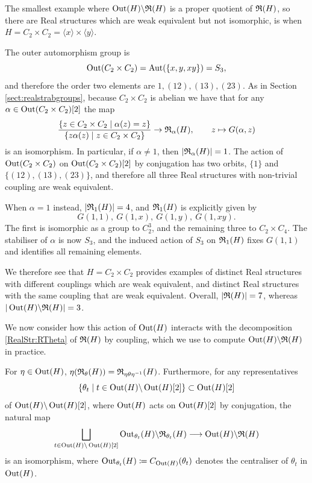\begin{eg}
The smallest example where $\operatorname{Out}(H) \backslash {\mathfrak R}(H)$ is a proper quotient of ${\mathfrak R}(H)$, so there are Real structures which are weak equivalent but not isomorphic, is when $H = C_2 \times C_2 = \langle x \rangle \times \langle y \rangle$. 

The outer automorphism group is
\[
\operatorname{Out}(C_2 \times C_2) = \operatorname{Aut}(\{x,y,xy\}) = S_3,
\]
and therefore the order two elements are $1, (12), (13), (23)$. As in Section \ref{sect:realstrabgroups}, because $C_2 \times C_2$ is abelian we have that for any $\alpha \in \operatorname{Out}(C_2 \times C_2)[2]$ the map 
\[
\frac{\{z \in C_2 \times C_2 \mid \alpha(z) = z\}}{\{z\alpha(z) \mid z \in C_2 \times C_2\}} \rightarrow {\mathfrak R}_{\alpha}(H), \qquad z \mapsto G(\alpha, z)
\]
is an isomorphism. In particular, if $\alpha \neq 1$, then $|{\mathfrak R}_{\alpha}(H)| = 1$. The action of $\operatorname{Out}(C_2 \times C_2)$ on $\operatorname{Out}(C_2 \times C_2)[2]$ by conjugation has two orbits, $\{1\}$ and $\{(12), (13), (23)\}$, and therefore all three Real structures with non-trivial coupling are weak equivalent.

When $\alpha = 1$ instead, $|{\mathfrak R}_{1}(H)| = 4$, and ${\mathfrak R}_{1}(H)$ is explicitly given by 
\[
G(1, 1), \: G(1,x), \: G(1,y), \: G(1,xy).
\]
The first is isomorphic as a group to $C_2^3$, and the remaining three to $C_2 \times C_4$. The stabiliser of $\alpha$ is now $S_3$, and the induced action of $S_3$ on ${\mathfrak R}_{1}(H)$ fixes $G(1,1)$ and identifies all remaining elements.

We therefore see that $H = C_2 \times C_2$ provides examples of distinct Real structures with different couplings which are weak equivalent, and distinct Real structures with the same coupling that are weak equivalent. Overall, $|{\mathfrak R}(H)| = 7$, whereas $|\operatorname{Out}(H) \backslash {\mathfrak R}(H)| = 3$. 
\end{eg}

We now consider how this action of $\operatorname{Out}(H)$ interacts with the decomposition \eqref{RealStr:RTheta} of ${\mathfrak R}(H)$ by coupling, which we use to compute $\operatorname{Out}(H) \backslash {\mathfrak R}(H)$ in practice.

\begin{lemma} \label{lemma:weak_eq}
  For $\eta \in \operatorname{Out}(H)$, $\eta({\mathfrak R}_{\theta}(H)) = {\mathfrak R}_{\eta \theta \eta^{-1}}(H)$. Furthermore, for any representatives
  \[
  \{\theta_t \mid t \in \operatorname{Out}(H) \backslash \operatorname{Out}(H)[2]\} \subset \operatorname{Out}(H)[2]
  \]
  of $\operatorname{Out}(H) \backslash \operatorname{Out}(H)[2]$, where $\operatorname{Out}(H)$ acts on $\operatorname{Out}(H)[2]$ by conjugation, the natural map
  \[
  \bigsqcup_{t \in \operatorname{Out}(H) \backslash \operatorname{Out}(H)[2]} \operatorname{Out}_{\theta_t}(H) \backslash {\mathfrak R}_{\theta_t}(H) \longrightarrow \operatorname{Out}(H) \backslash {\mathfrak R}(H)
  \]
  is an isomorphism, where $\operatorname{Out}_{\theta_t}(H) \coloneqq C_{\operatorname{Out}(H)}(\theta_t)$ denotes the centraliser of $\theta_t$ in $\operatorname{Out}(H)$.
\end{lemma}

